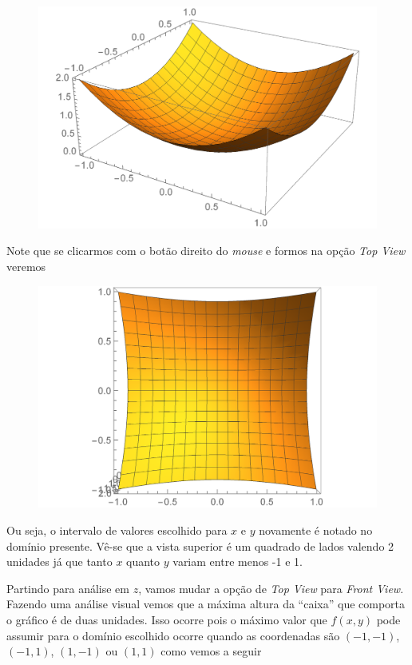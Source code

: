 \documentclass[a4paper, 12pt]{article}
\begin{document}
	\begin{figure}[!h]\label{parabola}
		\centering
		\includegraphics[scale=.6]{images/parabola3d}
	\end{figure}

	Note que se clicarmos com o botão direito do \textit{mouse} e formos na opção \textit{Top View} veremos
	
	\begin{figure}[!h]\label{parabola}
		\centering
		\includegraphics[scale=.55]{images/parabola3dtop}
	\end{figure}
	
	Ou seja, o intervalo de valores escolhido para $x$ e $y$ novamente é notado no domínio presente. Vê-se que a vista superior é um quadrado de lados valendo 2 unidades já que tanto $x$ quanto $y$ variam entre menos -1 e 1.
	
	Partindo para análise em $z$, vamos mudar a opção de \textit{Top View} para \textit{Front View}. Fazendo uma análise visual vemos que a máxima altura da ``caixa'' que comporta o gráfico é de duas unidades. Isso ocorre pois o máximo valor que $f(x,y)$ pode assumir para o domínio escolhido ocorre quando as coordenadas são $(-1,-1)$, $(-1,1)$, $(1,-1)$ ou $(1,1)$ como vemos a seguir
	
\end{document}
